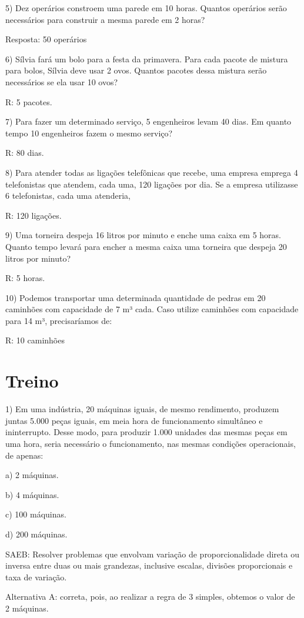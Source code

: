 5) Dez operários constroem uma parede em 10 horas. Quantos operários
serão necessários para construir a mesma parede em 2 horas?

Resposta: 50 operários

6) Sílvia fará um bolo para a festa da primavera. Para cada pacote de
mistura para bolos, Sílvia deve usar 2 ovos. Quantos pacotes dessa
mistura serão necessários se ela usar 10 ovos?

R: 5 pacotes.

7) Para fazer um determinado serviço, 5 engenheiros levam 40 dias. Em
quanto tempo 10 engenheiros fazem o mesmo serviço?

R: 80 dias.

8) Para atender todas as ligações telefônicas que recebe, uma empresa
emprega 4 telefonistas que atendem, cada uma, 120 ligações por dia. Se a
empresa utilizasse 6 telefonistas, cada uma atenderia,

R: 120 ligações.

9) Uma torneira despeja 16 litros por minuto e enche uma caixa em 5
horas. Quanto tempo levará para encher a mesma caixa uma torneira que
despeja 20 litros por minuto?

R: 5 horas.

10) Podemos transportar uma determinada quantidade de pedras em 20
caminhões com capacidade de 7 m³ cada. Caso utilize caminhões com
capacidade para 14 m³, precisaríamos de:

R: 10 caminhões

\section{Treino}

1) Em uma indústria, 20 máquinas iguais, de mesmo rendimento, produzem
juntas 5.000 peças iguais, em meia hora de funcionamento simultâneo e
ininterrupto. Desse modo, para produzir 1.000 unidades das mesmas peças
em uma hora, seria necessário o funcionamento, nas mesmas condições
operacionais, de apenas:

a) 2 máquinas.

b) 4 máquinas.

c) 100 máquinas.

d) 200 máquinas.

SAEB: Resolver problemas que envolvam variação de proporcionalidade
direta ou inversa entre duas ou mais grandezas, inclusive escalas,
divisões proporcionais e taxa de variação.

Alternativa A: correta, pois, ao realizar a regra de 3 simples, obtemos
o valor de 2 máquinas.


